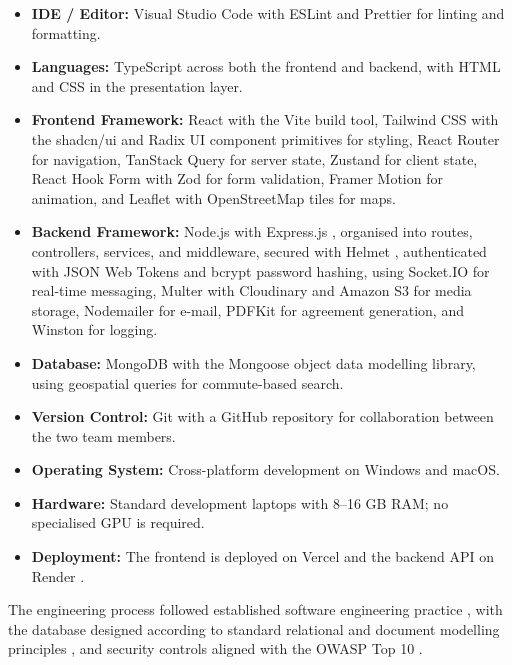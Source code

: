\begin{itemize}
    \item \textbf{IDE / Editor:} Visual Studio Code with ESLint and Prettier for linting and formatting.
    \item \textbf{Languages:} TypeScript \cite{typescript} across both the frontend and backend, with HTML and CSS \cite{mdn} in the presentation layer.
    \item \textbf{Frontend Framework:} React \cite{react} with the Vite \cite{vite} build tool, Tailwind CSS \cite{tailwind} with the shadcn/ui \cite{shadcn} and Radix UI \cite{radix} component primitives for styling, React Router \cite{reactrouter} for navigation, TanStack Query \cite{tanstack} for server state, Zustand \cite{zustand} for client state, React Hook Form \cite{reacthookform} with Zod \cite{zod} for form validation, Framer Motion \cite{framermotion} for animation, and Leaflet \cite{leaflet} with OpenStreetMap \cite{osm} tiles for maps.
    \item \textbf{Backend Framework:} Node.js \cite{nodejs} with Express.js \cite{express}, organised into routes, controllers, services, and middleware, secured with Helmet \cite{helmet}, authenticated with JSON Web Tokens \cite{jwt} and bcrypt \cite{bcrypt} password hashing, using Socket.IO \cite{socketio} for real-time messaging, Multer \cite{multer} with Cloudinary \cite{cloudinary} and Amazon S3 \cite{awss3} for media storage, Nodemailer \cite{nodemailer} for e-mail, PDFKit \cite{pdfkit} for agreement generation, and Winston \cite{winston} for logging.
    \item \textbf{Database:} MongoDB \cite{mongodb} with the Mongoose \cite{mongoose} object data modelling library, using geospatial queries \cite{geospatial} for commute-based search.
    \item \textbf{Version Control:} Git with a GitHub repository for collaboration between the two team members.
    \item \textbf{Operating System:} Cross-platform development on Windows and macOS.
    \item \textbf{Hardware:} Standard development laptops with 8--16 GB RAM; no specialised GPU is required.
    \item \textbf{Deployment:} The frontend is deployed on Vercel \cite{vercel} and the backend API on Render \cite{render}.
\end{itemize}

The engineering process followed established software engineering practice \cite{sommerville, pressman}, with the database designed according to standard relational and document modelling principles \cite{elmasri}, and security controls aligned with the OWASP Top 10 \cite{owasp}.

